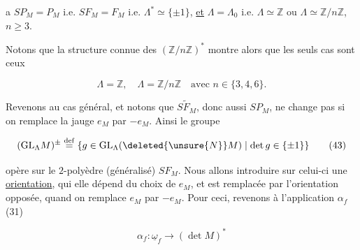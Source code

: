 

a $SP_M=P_M$ i.e. $SF_M=F_M$ i.e. $\Lambda^*\simeq\{\pm1\}$, \uline{et} $\Lambda=\Lambda_0$ i.e. $\Lambda\simeq\mathbb{Z}$ ou $\Lambda\simeq\mathbb{Z}/n\mathbb{Z}$, $n\geq3$.

Notons que la structure connue des $(\mathbb{Z}/n\mathbb{Z})^*$ montre alors que les seuls cas sont ceux  

\[
\Lambda=\mathbb{Z},\quad\Lambda=\mathbb{Z}/n\mathbb{Z}\quad\text{avec }n\in\{3,4,6\}.\tag*{(42)}
\]

Revenons au cas général,  et notons que $S\widetilde{F}_M$, donc aussi $SP_M$, ne  change pas si on remplace la jauge $e_M$ par $-e_M$. Ainsi le groupe

\[
(\mathrm{GL}_{\Lambda}M)^{\pm}\overset{\mathrm{def}}{=}\{g\in\mathrm{GL}_{\Lambda}(\deleted{\unsure{N}}M)\mid\det g\in\{\pm1\}\}\tag*{(43)}
\]

opère sur le $2$-polyèdre (généralisé) $SF_M$. Nous allons introduire sur celui-ci une \uline{orientation}, qui elle dépend du choix de $e_M$, et est remplacée par l'orientation opposée, quand on remplace $e_M$ par $-e_M$. Pour ceci, revenons à l'application $\alpha_f$ (31)

\[
\alpha_f:\underline{\omega}_f\longrightarrow(\det M)^*
\]

